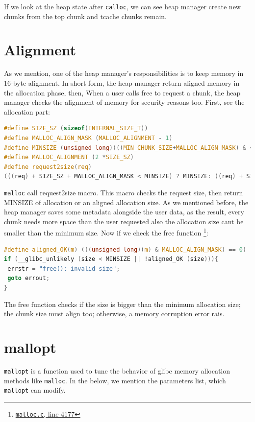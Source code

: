 \documentclass{masterthesis}
\newcommand*\libc{glibc}
\newcommand*\tch{tcache}
\newcommand*\mallocc{\lstinline{malloc}}
\newcommand*\callocc{\lstinline{calloc}}
\begin{document}
If we look at the heap state after \callocc{}, we can see heap manager create new chunks from the top chunk and \tch{} chunks remain.

\section{Alignment}
As we mention, one of the heap manager's responsibilities is to keep memory in 16-byte alignment. In short form, the heap manager return aligned memory in the allocation phase, then, When a user calls free to request a chunk, the heap manager checks the alignment of memory for security reasons too. First, see the allocation part:

\begin{lstlisting}[language=c,frame=tlrb]
#define SIZE_SZ (sizeof(INTERNAL_SIZE_T))
#define MALLOC_ALIGN_MASK (MALLOC_ALIGNMENT - 1)
#define MINSIZE (unsigned long)(((MIN_CHUNK_SIZE+MALLOC_ALIGN_MASK) & ~MALLOC_ALIGN_MASK))
#define MALLOC_ALIGNMENT (2 *SIZE_SZ)
#define request2size(req)
(((req) + SIZE_SZ + MALLOC_ALIGN_MASK < MINSIZE) ? MINSIZE: ((req) + SIZE_SZ + MALLOC_ALIGN_MASK) & ~MALLOC_ALIGN_MASK)
\end{lstlisting}

\mallocc{} call request2size macro. This macro checks the request size, then return MINSIZE of allocation or an aligned allocation size. As we mentioned before, the heap manager saves some metadata alongside the user data, as the result, every chunk needs more space than the user requested also the allocation size cant be smaller than the minimum size. Now if we check the free function \footnote{\href{https://sourceware.org/git/?p=glibc.git;a=blob;f=malloc/malloc.c;h=f7cd29bc2f93e1082ee77800bd64a4b2a2897055;hb=9ea3686266dca3f004ba874745a4087a89682617\#l4177}{\texttt{malloc.c}, line 4177}}:

\begin{lstlisting}[language=c,frame=tlrb]
#define aligned_OK(m) (((unsigned long)(m) & MALLOC_ALIGN_MASK) == 0)
if (__glibc_unlikely (size < MINSIZE || !aligned_OK (size))){
 errstr = "free(): invalid size";
 goto errout;
}
\end{lstlisting}

The free function checks if the size is bigger than the minimum allocation size; the chunk size must align too; otherwise, a memory corruption error rais.
\section{mallopt}
\lstinline{mallopt} is a function used to tune the behavior of \libc{} memory allocation methods like \mallocc{}. In the below, we mention the parameters list, which \lstinline{mallopt} can modify.
\end{document}
